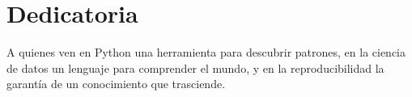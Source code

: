 \section*{Dedicatoria}
A quienes ven en Python una herramienta para descubrir patrones, 
en la ciencia de datos un lenguaje para comprender el mundo, 
y en la reproducibilidad la garantía de un conocimiento que trasciende.
